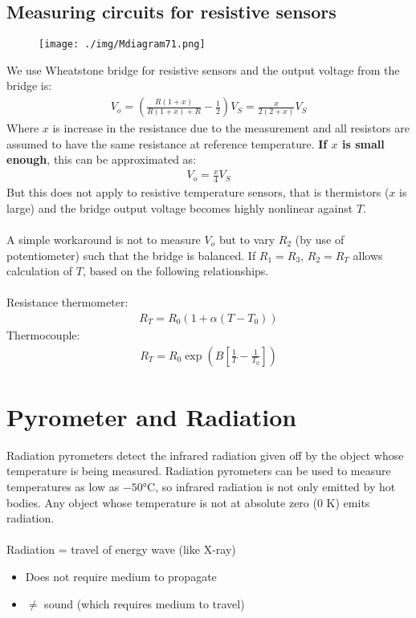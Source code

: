 \subsection{Measuring circuits for resistive sensors}
\begin{figure}[H]
  \centering
  \texttt{[image: ./img/Mdiagram71.png]}
\end{figure}
We use Wheatstone bridge for resistive sensors and the output voltage from the bridge is:
\begin{gather}
  V_o = \left(\frac{R(1+x)}{R(1+x)+R}-\frac{1}{2}\right)V_S = \frac{x}{2(2+x)}V_S
\end{gather}
Where $x$ is increase in the resistance due to the measurement and all resistors are assumed to have the same resistance at reference temperature. \textbf{If $x$ is small enough}, this can be approximated as:
\begin{gather}
  V_o = \frac{x}{4}V_S
\end{gather}
But this does not apply to resistive temperature sensors, that is thermistors ($x$ is large) and the bridge output voltage becomes highly nonlinear against $T$. \\\\
A simple workaround is not to measure $V_o$ but to vary $R_2$ (by use of potentiometer) such that the bridge is balanced. If $R_1 = R_3$, $R_2 = R_T$ allows calculation of $T$, based on the following relationships. \\\\
Resistance thermometer:
\begin{gather}
  R_T = R_0(1+\alpha(T-T_0))
\end{gather}
Thermocouple:
\begin{gather}
  R_T = R_0\exp\left(B\left[\frac{1}{T}-\frac{1}{T_0}\right]\right)
\end{gather}
\section{Pyrometer and Radiation}
Radiation pyrometers detect the infrared radiation given off by the object whose temperature is being measured. Radiation pyrometers can be used to measure temperatures as low as $\ang{-50}$C, so infrared radiation is not only emitted by hot bodies. Any object whose temperature is not at absolute zero (0 K) emits radiation. \\\\
Radiation = travel of energy wave (like X-ray)
\begin{itemize}
  \item Does not require medium to propagate
  \item $\neq$ sound (which requires medium to travel)
\end{itemize}
